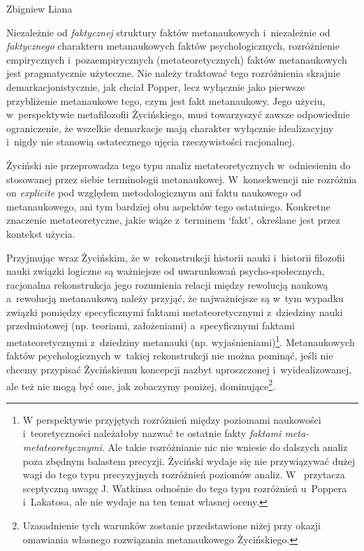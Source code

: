\begin{artplenv}{Zbigniew Liana}
\begin{uwaga}
Niezależnie od \textit{faktycznej} struktury faktów metanaukowych i~niezależnie od \textit{faktycznego} charakteru
metanaukowych faktów psychologicznych, rozróżnienie empirycznych i~pozaempirycznych (metateoretycznych) faktów
metanaukowych jest pragmatycznie użyteczne. Nie należy traktować tego rozróżnienia skrajnie demarkacjonistycznie, jak
chciał Popper, lecz wyłącznie jako pierwsze przybliżenie metanaukowe tego, czym jest fakt metanaukowy. Jego użyciu, w~perspektywie
metafilozofii Życińskiego, musi towarzyszyć zawsze odpowiednie ograniczenie, że wszelkie demarkacje mają
charakter wyłącznie idealizacyjny i~nigdy nie stanowią ostatecznego ujęcia rzeczywistości racjonalnej.
\end{uwaga}

\begin{uwaga}
Życiński nie przeprowadza tego typu analiz metateoretycznych w~odniesieniu do stosowanej przez siebie
terminologii metanaukowej. W~konsekwencji nie rozróżnia on \textit{explicite} pod względem metodologicznym ani faktu
naukowego od metanaukowego, ani tym bardziej obu aspektów tego ostatniego. Konkretne znaczenie metateoretyczne,
jakie wiąże z~terminem `fakt', określane jest przez kontekst użycia.
\end{uwaga}
	
Przyjmując wraz Życińskim, że w~rekonstrukcji historii nauki i~historii filozofii nauki związki logiczne są ważniejsze
od uwarunkowań psycho-społecznych, racjonalna rekonstrukcja jego rozumienia relacji między rewolucją naukową a~rewolucją
metanaukową należy przyjąć, że najważniejsze są w~tym wypadku związki pomiędzy specyficznymi faktami
metateoretycznymi z~dziedziny nauki przedmiotowej (np. teoriami, założeniami) a~specyficznymi faktami metateoretycznymi z~dziedziny
metanauki (np. wyjaśnieniami)\footnote{W perspektywie przyjętych rozróżnień między poziomami naukowości i~teoretyczności
należałoby nazwać te ostatnie fakty \textit{faktami meta-metateoretycznymi}. Ale takie rozróżnianie nic
nie wniesie do dalszych analiz poza zbędnym balastem precyzji. Życiński wydaje się nie przywiązywać dużej wagi do tego
typu precyzyjnych rozróżnień poziomów analiz.
W~\parencite[s.~123]{zycinski_jezyk_1983}
przytacza sceptyczną uwagę J. Watkinsa odnośnie do tego typu rozróżnień u~Poppera i~Lakatosa, ale nie wydaje na
ten temat własnej oceny.}. Metanaukowych faktów psychologicznych w~takiej rekonstrukcji nie można pominąć, jeśli nie
chcemy przypisać Życińskiemu koncepcji nazbyt uproszczonej i~wyidealizowanej, ale też nie mogą być one, jak zobaczymy
poniżej, dominujące\footnote{Uzasadnienie tych warunków zostanie przedstawione niżej przy okazji omawiania własnego
rozwiązania metanaukowego Życińskiego.}.


\end{artplenv}
